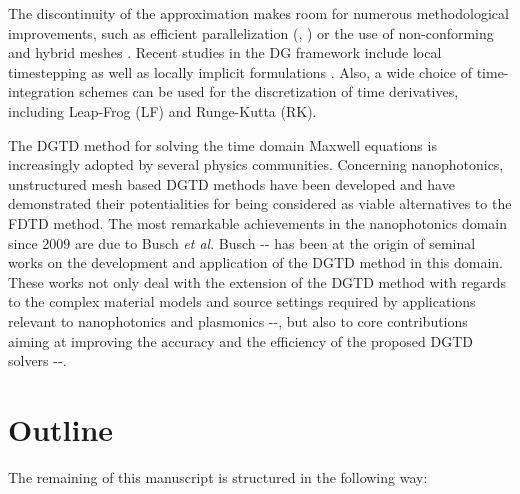 

The discontinuity of the approximation makes room for numerous methodological improvements, such as efficient parallelization (\cite{Diehl1}, \cite{Bernacki1}) or the use of non-conforming \cite{Fahs2} and hybrid meshes \cite{Leger1}. Recent studies in the DG framework include local timestepping \cite{Piperno1} as well as locally implicit formulations \cite{Moya1}. Also, a wide choice of time-integration schemes can be used for the discretization of time derivatives, including Leap-Frog (LF) and Runge-Kutta (RK).

The DGTD method for solving the time domain Maxwell equations is increasingly adopted by several physics communities. Concerning nanophotonics, unstructured mesh based DGTD methods have been developed and have demonstrated their potentialities for being considered as viable alternatives to the FDTD method. The most remarkable achievements in the  nanophotonics domain since 2009 are due to Busch {\em et al}. Busch \cite{Niegemann4}-\cite{Stannigel1}-\cite{Busch1} has been at the origin of seminal works on the development and application of the DGTD method in this domain. These works not only deal with the extension of the DGTD method with regards to the complex material models and source  settings required by applications relevant to nanophotonics and plasmonics \cite{Konig1}-\cite{Matyssek1}-\cite{Wolff1}, but also to core contributions aiming at improving the accuracy and the efficiency of the proposed DGTD solvers \cite{Niegemann2}-\cite{Niegemann3}-\cite{Demirel1}.

\section{Outline}

The remaining of this manuscript is structured in the following way:

